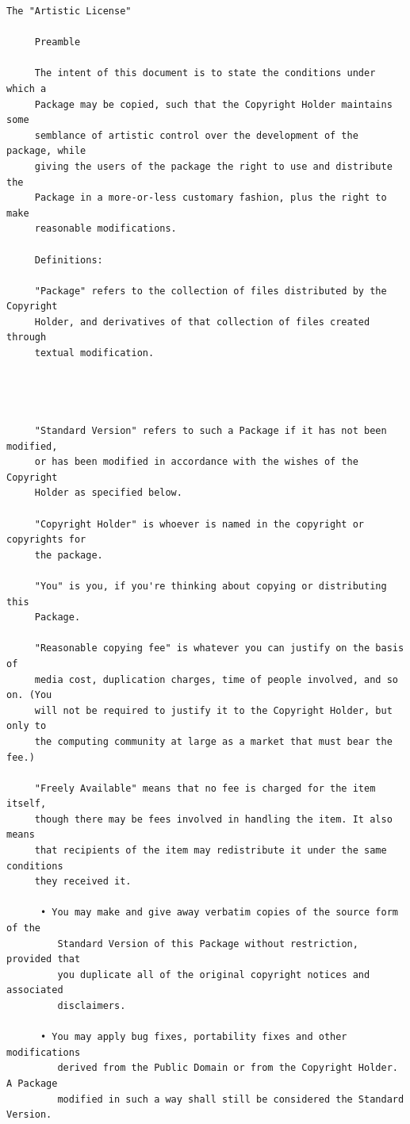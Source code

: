 \begin{lstlisting}[basicstyle=\ttfamily\footnotesize,breaklines=true]
     The "Artistic License"

     Preamble

     The intent of this document is to state the conditions under which a
     Package may be copied, such that the Copyright Holder maintains some
     semblance of artistic control over the development of the package, while
     giving the users of the package the right to use and distribute the
     Package in a more-or-less customary fashion, plus the right to make
     reasonable modifications.

     Definitions:

     "Package" refers to the collection of files distributed by the Copyright
     Holder, and derivatives of that collection of files created through
     textual modification.




     "Standard Version" refers to such a Package if it has not been modified,
     or has been modified in accordance with the wishes of the Copyright
     Holder as specified below.

     "Copyright Holder" is whoever is named in the copyright or copyrights for
     the package.

     "You" is you, if you're thinking about copying or distributing this
     Package.

     "Reasonable copying fee" is whatever you can justify on the basis of
     media cost, duplication charges, time of people involved, and so on. (You
     will not be required to justify it to the Copyright Holder, but only to
     the computing community at large as a market that must bear the fee.)

     "Freely Available" means that no fee is charged for the item itself,
     though there may be fees involved in handling the item. It also means
     that recipients of the item may redistribute it under the same conditions
     they received it.

      • You may make and give away verbatim copies of the source form of the
         Standard Version of this Package without restriction, provided that
         you duplicate all of the original copyright notices and associated
         disclaimers.

      • You may apply bug fixes, portability fixes and other modifications
         derived from the Public Domain or from the Copyright Holder. A Package
         modified in such a way shall still be considered the Standard Version.


\end{lstlisting}
